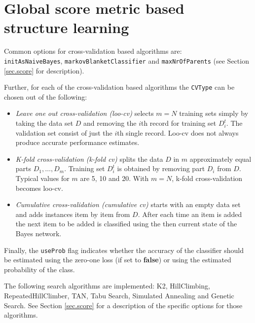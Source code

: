 \section{Global score metric based structure learning}

\begin{center}
\end{center}

Common options for cross-validation based algorithms are: \\
{\tt initAsNaiveBayes}, {\tt markovBlanketClassifier} and {\tt maxNrOfParents}
(see Section \ref{sec.score} for description).

Further, for each of the cross-validation based algorithms the {\tt CVType} can be
chosen out of the following:

\begin{itemize}
\item {\em Leave one out cross-validation (loo-cv)} selects $m=N$ training sets 
simply by taking the data set $D$ and removing the $i$th record for training 
set $D_i^t$. The validation set consist of just the $i$th single record. 
Loo-cv does not always produce accurate performance estimates. 

\item {\em K-fold cross-validation (k-fold cv)} splits the data $D$ in $m$ approximately 
equal parts $D_1,\ldots,D_m$. Training set $D_i^t$ is obtained by removing part 
$D_i$ from $D$. Typical values for $m$ are 5, 10 and 20. With $m=N$, k-fold cross-validation becomes loo-cv. 

\item {\em Cumulative cross-validation (cumulative cv)} starts with an empty data
set and adds instances item by item from $D$. After each time an item is added
the next item to be added is classified using the then current state of the
Bayes network.
\end{itemize}

Finally, the {\tt useProb} flag indicates whether the accuracy of the classifier
should be estimated using the zero-one loss (if set to {\bf false}) or using
the estimated probability of the class.

\begin{center}
\end{center}

The following search algorithms are implemented: K2, HillClimbing, RepeatedHillClimber,
TAN, Tabu Search, Simulated Annealing and Genetic Search. See Section \ref{sec.score} for
a description of the specific options for those algorithms.

